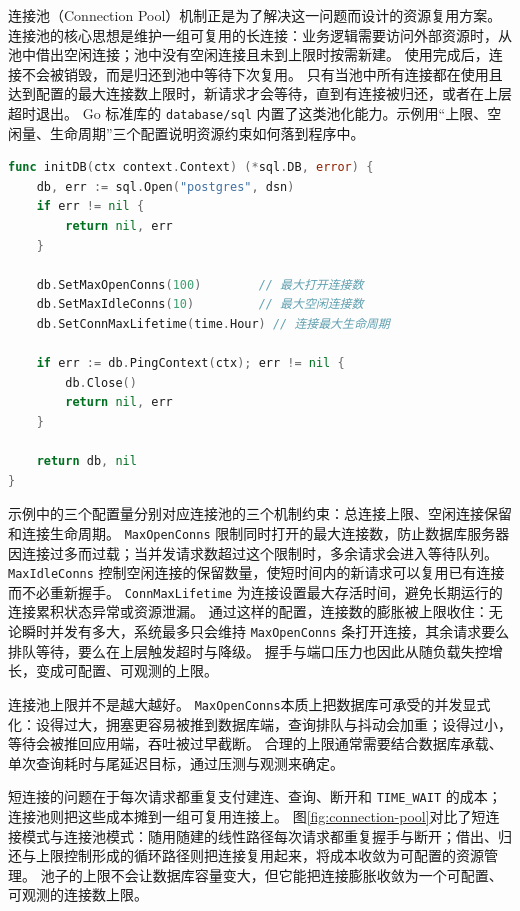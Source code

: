 连接池（Connection Pool）机制正是为了解决这一问题而设计的资源复用方案。
连接池的核心思想是维护一组可复用的长连接：业务逻辑需要访问外部资源时，从池中借出空闲连接；池中没有空闲连接且未到上限时按需新建。
使用完成后，连接不会被销毁，而是归还到池中等待下次复用。
只有当池中所有连接都在使用且达到配置的最大连接数上限时，新请求才会等待，直到有连接被归还，或者在上层超时退出。
Go 标准库的 \texttt{database/sql} 内置了这类池化能力。示例用“上限、空闲量、生命周期”三个配置说明资源约束如何落到程序中。


\begin{tcolorbox}[title=连接池上限与生命周期（示意）]
\begin{lstlisting}[style=codeblock, language=go]
func initDB(ctx context.Context) (*sql.DB, error) {
    db, err := sql.Open("postgres", dsn)
    if err != nil {
        return nil, err
    }
    
    db.SetMaxOpenConns(100)        // 最大打开连接数
    db.SetMaxIdleConns(10)         // 最大空闲连接数
    db.SetConnMaxLifetime(time.Hour) // 连接最大生命周期

    if err := db.PingContext(ctx); err != nil {
        db.Close()
        return nil, err
    }
    
    return db, nil
}
\end{lstlisting}
\end{tcolorbox}

示例中的三个配置量分别对应连接池的三个机制约束：总连接上限、空闲连接保留和连接生命周期。
\texttt{MaxOpenConns} 限制同时打开的最大连接数，防止数据库服务器因连接过多而过载；当并发请求数超过这个限制时，多余请求会进入等待队列。
\texttt{MaxIdleConns} 控制空闲连接的保留数量，使短时间内的新请求可以复用已有连接而不必重新握手。
\texttt{ConnMaxLifetime} 为连接设置最大存活时间，避免长期运行的连接累积状态异常或资源泄漏。
通过这样的配置，连接数的膨胀被上限收住：无论瞬时并发有多大，系统最多只会维持 \texttt{MaxOpenConns} 条打开连接，其余请求要么排队等待，要么在上层触发超时与降级。
握手与端口压力也因此从随负载失控增长，变成可配置、可观测的上限。

连接池上限并不是越大越好。
\texttt{MaxOpenConns}本质上把数据库可承受的并发显式化：设得过大，拥塞更容易被推到数据库端，查询排队与抖动会加重；设得过小，等待会被推回应用端，吞吐被过早截断。
合理的上限通常需要结合数据库承载、单次查询耗时与尾延迟目标，通过压测与观测来确定。

短连接的问题在于每次请求都重复支付建连、查询、断开和 \texttt{TIME\_WAIT} 的成本；连接池则把这些成本摊到一组可复用连接上。
图\ref{fig:connection-pool}对比了短连接模式与连接池模式：随用随建的线性路径每次请求都重复握手与断开；借出、归还与上限控制形成的循环路径则把连接复用起来，将成本收敛为可配置的资源管理。
池子的上限不会让数据库容量变大，但它能把连接膨胀收敛为一个可配置、可观测的连接数上限。

